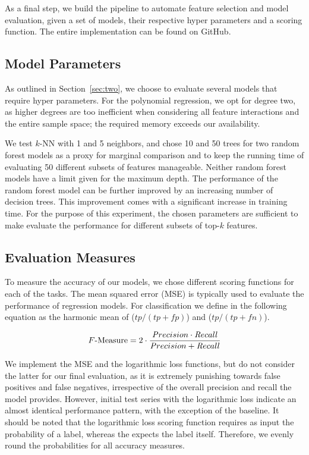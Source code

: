 As a final step, we build the pipeline to automate feature selection and model
evaluation, given a set of models, their respective hyper parameters and a
scoring function.  The entire implementation can be found on
GitHub.

\subsection{Model Parameters}

As outlined in Section~\ref{sec:two}, we choose to evaluate several models that
require hyper parameters.  For the polynomial regression, we opt for degree two,
as higher degrees are too inefficient when considering all feature interactions
and the entire sample space; the required memory exceeds our availability.

We test $k$-NN with 1 and 5 neighbors, and chose 10 and 50 trees for two random
forest models as a proxy for marginal comparison and to keep the running time of
evaluating 50 different subsets of features manageable.  Neither random forest
models have a limit given for the maximum depth.  The performance of the random
forest model can be further improved by an increasing number of decision trees.
This improvement comes with a significant increase in training time.  For the
purpose of this experiment, the chosen parameters are sufficient to make
evaluate the performance for different subsets of top-$k$ features.

\subsection{Evaluation Measures}

To measure the accuracy of our models, we chose different scoring functions for
each of the tasks.  The mean squared error (MSE) is typically used to evaluate
the performance of regression models.  For classification we define \fmeasure{}
in the following equation as the harmonic mean of \precision{}
($tp / (tp + fp)$) and \recall{} ($tp / (tp + fn)$).

\vspace{-.5em}
\begin{equation}\label{eq:fmeasure}
  \text{\ensuremath{F}-Measure} = 2 \cdot \frac{{\mathop{\mathit Precision}} \cdot {\mathop{\mathit Recall}}} {{\mathop{\mathit Precision}} +
    {\mathop{\mathit Recall}}}
\end{equation}

We implement the MSE and the logarithmic
loss functions, but do not
consider the latter for our final evaluation, as it is extremely punishing
towards false positives and false negatives, irrespective of the overall
precision and recall the model provides.  However, initial test series with the
logarithmic loss indicate an almost identical performance pattern, with the
exception of the baseline.  It should be noted that the logarithmic loss scoring
function requires as input the probability of a label, whereas the \fmeasure{}
expects the label itself.  Therefore, we evenly round the probabilities for all
accuracy measures.

